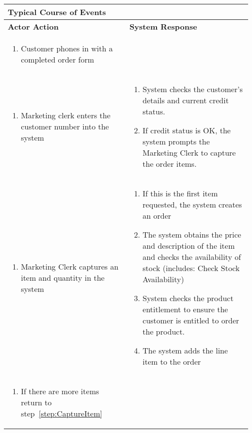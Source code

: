 \documentclass[12pt,a4paper]{article}
\newcounter{stockAvailabilityCheck}
\newcounter{checkCustomerDetails}
\begin{document}
\begin{longtable}{|p{}|p{}|}\hline
  \multicolumn{2}{|p{1.095\textwidth}|}{\textbf{Typical Course of Events}} \\\hline
  \textbf{Actor Action} & \textbf{System Response} \\\hline
  \begin{enumerate}[series=typical]
    \item Customer phones in with a completed order form
  \end{enumerate} & \\\hline
  \begin{enumerate}[resume=typical]
    \item Marketing clerk enters the customer number into the system
    \label{step:EnterCustomerDetails}
  \end{enumerate}
  &
  \begin{enumerate}[resume=typical]
    \item System checks the customer's details and current credit status.
      \setcounter{checkCustomerDetails}{\value{enumi}}
    \item If credit status is OK, the system prompts the Marketing Clerk to
      capture the order items.
      \label{step:CaptureItem}
  \end{enumerate} \\\hline
  \begin{enumerate}[resume=typical]
    \item Marketing Clerk captures an item and quantity in the system
  \end{enumerate}
  &
  \begin{enumerate}[resume=typical]
    \item If this is the first item requested, the system creates an order
    \item The system obtains the price and description of the item and checks
      the availability of stock (includes: Check Stock Availability)
      \label{step:StockAvailabilityCheck}
      \setcounter{stockAvailabilityCheck}{\value{enumi}}
    \item System checks the product entitlement to ensure the customer is
      entitled to order the product.
    \item The system adds the line item to the order
  \end{enumerate} \\\hline
  \begin{enumerate}[resume=typical]
    \item If there are more items return to step~\ref{step:CaptureItem}

\end{enumerate}
\end{longtable}
\end{document}
